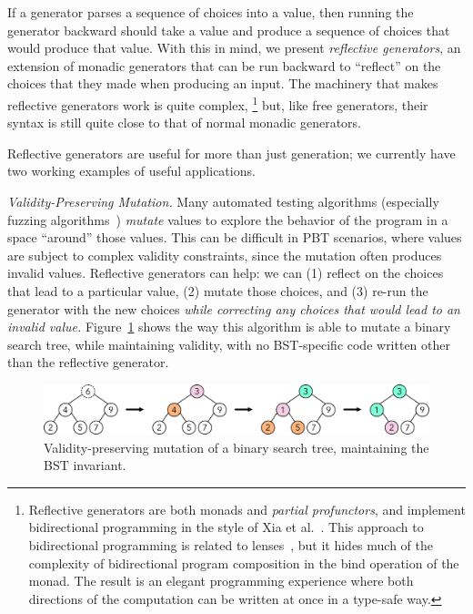 If a generator parses a sequence of choices into a value, then running the
generator backward should take a value and produce a sequence of choices that
would produce that value. With this in mind, we present {\em reflective
generators}, an extension of monadic generators that can be run backward to
``reflect'' on the choices that they made when producing an input. The machinery
that makes reflective generators work is quite complex,%
\footnote{Reflective generators are both monads and {\em partial profunctors},
and implement bidirectional programming in the style of Xia et
al.~\cite{xia2019composing}. This approach to bidirectional programming is
related to lenses~\cite{foster2009bidirectional}, but it hides much of the
complexity of bidirectional program composition in the bind operation of the
monad. The result is an elegant programming experience where both directions of
the computation can be written at once in a type-safe way.}
but, like free generators, their syntax is still quite close to that of normal
monadic generators.

Reflective generators are useful for more than just generation; we currently
have two working examples of useful applications.

{\em Validity-Preserving Mutation.} Many automated testing algorithms
(especially fuzzing algorithms~\cite{afl-readme}) {\em mutate} values to explore
the behavior of the program in a space ``around'' those values. This can be
difficult in PBT scenarios, where values are subject to complex validity
constraints, since the mutation often produces invalid values. Reflective
generators can help: we can (1) reflect on the choices that lead to a particular
value, (2) mutate those choices, and (3) re-run the generator with the new
choices {\em while correcting any choices that
would lead to an invalid value.} Figure~\ref{fig:mutation} shows the way this
algorithm is able to mutate a binary search tree, while maintaining validity,
with no BST-specific code written other than the reflective generator.

\begin{figure}[h]
  \centering
  \includegraphics[width=.6\textwidth]{assets/mutate-diagram.pdf}
  \caption{Validity-preserving mutation of a binary search tree, maintaining the
  BST invariant.}\label{fig:mutation}
\end{figure}

